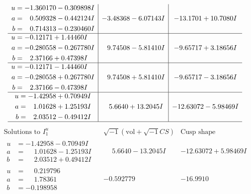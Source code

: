 \documentclass[1p]{elsarticle_modified}
\theoremstyle{definition}
\newcommand{\I}{\sqrt{-1}}
\begin{document}
$$\begin{array}{c|c|c}
\begin{aligned}
u &= -1.360170 - 0.309898 I \\
a &= \phantom{-}0.509328 - 0.442124 I \\
b &= \phantom{-}0.714313 - 0.230460 I\end{aligned}
 & -3.48368 - 6.07143 I & -13.1701 + 10.7080 I \\ \hline\begin{aligned}
u &= -0.12171 + 1.44460 I \\
a &= -0.280558 - 0.267780 I \\
b &= \phantom{-}2.37166 + 0.47398 I\end{aligned}
 & \phantom{-}9.74508 - 5.81410 I & -9.65717 + 3.18656 I \\ \hline\begin{aligned}
u &= -0.12171 - 1.44460 I \\
a &= -0.280558 + 0.267780 I \\
b &= \phantom{-}2.37166 - 0.47398 I\end{aligned}
 & \phantom{-}9.74508 + 5.81410 I & -9.65717 - 3.18656 I \\ \hline\begin{aligned}
u &= -1.42958 + 0.70949 I \\
a &= \phantom{-}1.01628 + 1.25193 I \\
b &= \phantom{-}2.03512 - 0.49412 I\end{aligned}
 & \phantom{-}5.6640 + 13.2045 I & -12.63072 - 5.98469 I\\
 \hline 
 \end{array}$$\newpage$$\begin{array}{c|c|c}  
\text{Solutions to }I^u_{1}& \I (\text{vol} + \sqrt{-1}CS) & \text{Cusp shape}\\
 \hline 
\begin{aligned}
u &= -1.42958 - 0.70949 I \\
a &= \phantom{-}1.01628 - 1.25193 I \\
b &= \phantom{-}2.03512 + 0.49412 I\end{aligned}
 & \phantom{-}5.6640 - 13.2045 I & -12.63072 + 5.98469 I \\ \hline\begin{aligned}
u &= \phantom{-}0.219796\phantom{ +0.000000I} \\
a &= \phantom{-}1.78361\phantom{ +0.000000I} \\
b &= -0.198958\phantom{ +0.000000I}\end{aligned}
 & -0.592779\phantom{ +0.000000I} & -16.9910\phantom{ +0.000000I} \\ \hline\begin{aligned}

\end{aligned}
\end{array}$$
\end{document}
